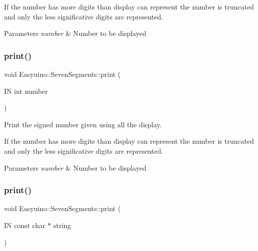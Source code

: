 If the number has more digits than display can represent the number is truncated and only the less significative digits are represented. 
\begin{DoxyParams}{Parameters}
{\em number} & Number to be displayed \\
\hline
\end{DoxyParams}
\mbox{\label{class_easyuino_1_1_seven_segments_aac9aa8753f313330c9737987ff4f2220}} 
\subsubsection{\texorpdfstring{print()}{print()}\hspace{0.1cm}{\footnotesize\ttfamily [3/4]}}
{\footnotesize\ttfamily void Easyuino\+::\+Seven\+Segments\+::print (\begin{DoxyParamCaption}\item[{IN int}]{number }\end{DoxyParamCaption})}



Print the signed number given using all the display. 

If the number has more digits than display can represent the number is truncated and only the less significative digits are represented. 
\begin{DoxyParams}{Parameters}
{\em number} & Number to be displayed \\
\hline
\end{DoxyParams}
\mbox{\label{class_easyuino_1_1_seven_segments_ab5792bc2318cadd334aebccfad7db77e}} 
\subsubsection{\texorpdfstring{print()}{print()}\hspace{0.1cm}{\footnotesize\ttfamily [4/4]}}
{\footnotesize\ttfamily void Easyuino\+::\+Seven\+Segments\+::print (\begin{DoxyParamCaption}\item[{IN const char $\ast$}]{string }\end{DoxyParamCaption})}



